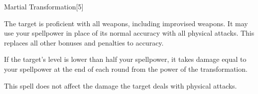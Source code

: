 \begin{spellsection}{Martial Transformation}[5]
    \begin{spellheader}
    \end{spellheader}
    \begin{spellcontent}
        \begin{spelltargetinginfo}
        \end{spelltargetinginfo}
        \begin{spelleffects}
            \spelleffect The target is proficient with all weapons, including improvised weapons.
            It may use your spellpower  in place of its normal accuracy with all physical attacks.
            This replaces all other bonuses and penalties to accuracy.

            If the target's level is lower than half your spellpower, it takes damage equal to your spellpower at the end of each round from the power of the transformation.
            \spelldur \durshort
        \end{spelleffects}
    \end{spellcontent}
    \begin{spellfooter}
        \spellnotes This spell does not affect the damage the target deals with physical attacks.
        \miscastexplode
    \end{spellfooter}
    \begin{spellaugments}
    \end{spellaugments}
\end{spellsection}

